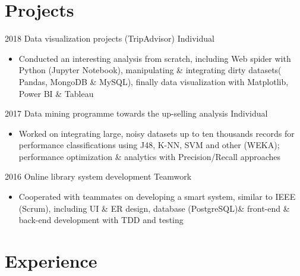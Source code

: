 \documentclass[letterpaper]{twentysecondcv} %
\begin{document}
\makeprofile    %








\section{Projects}

\begin{twenty}
	\twentyitem
        {2018}
        {Data visualization projects (TripAdvisor)}
        {Individual}
        {}
        {
        {\begin{itemize}
        \item Conducted an interesting analysis from scratch, including Web spider with Python (Jupyter Notebook), manipulating \& integrating dirty datasets( Pandas, MongoDB \& MySQL), finally data visualization with Matplotlib, Power BI \& Tableau

    \end{itemize}}
        }
        \twentyitem
        {2017}
        {Data mining programme towards the up-selling analysis}
        {Individual}
        {}
        {
        {\begin{itemize}
        \item Worked on integrating large, noisy datasets up to ten thousands records for performance classifications using J48, K-NN, SVM and other (WEKA); performance optimization \& analytics with Precision/Recall approaches

    \end{itemize}}
        }
    	\twentyitem
        {2016}
        {Online library system development}
        {Teamwork}
        {}
        {
        {\begin{itemize}
        \item Cooperated with teammates on developing a smart system, similar to IEEE (Scrum), including UI \& ER design, database (PostgreSQL)\& front-end \& back-end development with TDD and testing
    \end{itemize}}
        }  
        
\end{twenty}

\section{Experience}
\end{document}
